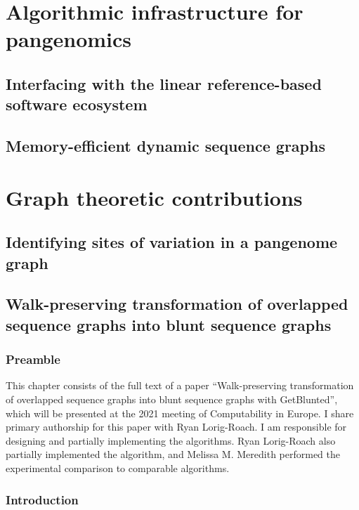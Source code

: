 \documentclass[11pt]{ucthesis}
\begin{document}
\part{Algorithmic infrastructure for pangenomics}

\chapter{Interfacing with the linear reference-based software ecosystem}

\chapter{Memory-efficient dynamic sequence graphs}

\part{Graph theoretic contributions}

\chapter{Identifying sites of variation in a pangenome graph}

\chapter{Walk-preserving transformation of overlapped sequence graphs into blunt sequence graphs}

\section{Preamble}

This chapter consists of the full text of a paper ``Walk-preserving transformation of overlapped sequence graphs into blunt sequence graphs with GetBlunted'', which will be presented at the 2021 meeting of Computability in Europe. I share primary authorship for this paper with Ryan Lorig-Roach. I am responsible for designing and partially implementing the algorithms. Ryan Lorig-Roach also partially implemented the algorithm, and Melissa M. Meredith performed the experimental comparison to comparable algorithms.

\section{Introduction}
\end{document}

